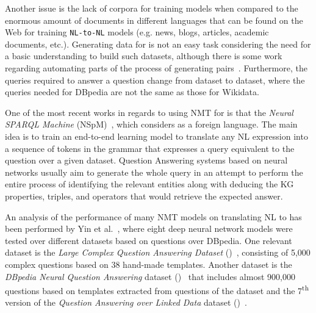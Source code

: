 Another issue is the lack of corpora for training \NLtoSPARQL{} models when compared to 
the enormous amount of documents in different languages that can be found on the Web for 
training \texttt{NL-to-NL} models (e.g. news, blogs, articles, academic documents, etc.). Generating 
data for \NLtoSPARQL{} is not an easy task considering the need for a basic \SPARQL{} understanding 
to build such datasets, although there is some work regarding automating parts 
of the process of generating \NLtoSPARQL{} pairs~\cite{dataset:dbnqa-hartmann-marx-soru-2018, 
dataset:lcquad-TrivediMDL17}. Furthermore, the queries required to answer a question change from 
dataset to dataset, where the \SPARQL{} queries needed for DBpedia are not the same as those for Wikidata.

One of the most recent works in regards to using NMT for \SPARQL{} is that 
the \textit{Neural SPARQL Machine} (NSpM)~\cite{nmt:nspm-SoruMMPVEN17}, which considers \SPARQL{} as a foreign 
language. The main idea is to train an end-to-end learning model to translate any NL expression 
into a sequence of tokens in the \SPARQL{} grammar that expresses a query equivalent to the 
question over a given dataset. Question Answering systems based on neural networks usually 
aim to generate the whole \SPARQL{} query in an attempt to perform the entire process of 
identifying the relevant entities along with deducing the KG properties, triples, and operators 
that would retrieve the expected answer. 

An analysis of the performance of many NMT models on translating NL to \SPARQL{} 
has been performed by Yin et al.~\cite{nmt:nl-to-sparql-Yin19}, where eight deep neural network models 
were tested over different datasets based on questions over DBpedia. One relevant dataset is the 
\textit{Large Complex Question Answering Dataset} (\LCQuADone)~\cite{dataset:lcquad-TrivediMDL17}, 
consisting of 5,000 complex questions based on 38 hand-made templates. Another dataset is the 
\textit{DBpedia Neural Question Answering} dataset (\DBNQA)~\cite{dataset:dbnqa-hartmann-marx-soru-2018} 
that includes almost 900,000 questions based on templates extracted from questions of the \LCQuADone{} 
dataset and the 7\textsuperscript{th} version of the \textit{Question Answering over Linked Data} 
dataset (\QALDseven)~\cite{dataset:qald7-UsbeckNHKRN17}.

